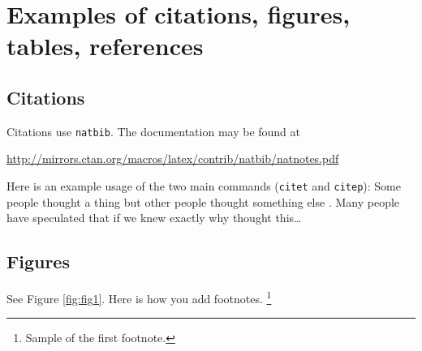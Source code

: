 \documentclass{article}
\begin{document}



\section{Examples of citations, figures, tables, references}
\label{sec:others}

\subsection{Citations}
Citations use \verb+natbib+. The documentation may be found at
\begin{center}
	\url{http://mirrors.ctan.org/macros/latex/contrib/natbib/natnotes.pdf}
\end{center}

Here is an example usage of the two main commands (\verb+citet+ and \verb+citep+): Some people thought a thing \citep{kour2014real, hadash2018estimate} but other people thought something else \citep{kour2014fast}. Many people have speculated that if we knew exactly why \citet{kour2014fast} thought this\dots

\subsection{Figures}
\lipsum[10]
See Figure \ref{fig:fig1}. Here is how you add footnotes. \footnote{Sample of the first footnote.}
\lipsum[11]
\end{document}
